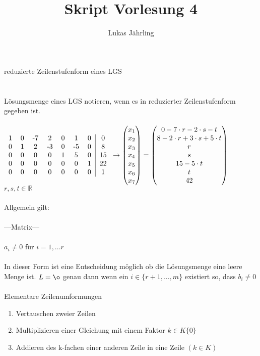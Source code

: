 \documentclass{scrartcl}
\title{Skript Vorlesung 4}
\author{Lukas Jährling}
\begin{document}
	\large
	reduzierte Zeilenstufenform eines LGS
	\\
	\\
	\\
	\normalsize
	Lösungsmenge eines LGS notieren, wenn es in reduzierter Zeilenstufenform gegeben ist.
	\\
	\\
	$
	\begin{tabular}{c c c c c c c|c}
		1 & 0 & -7 & 2 & 0 & 1 & 0 & 0
		\\
		0 & 1 & 2 & -3 & 0 & -5 & 0 & 8
		\\
		0 & 0 & 0 & 0 & 1 & 5 & 0 & 15
		\\
		0 & 0 & 0 & 0 & 0 & 0 & 1 & 22
		\\
		0 & 0 & 0 & 0 & 0 & 0 & 0 & 1
	\end{tabular}
	\rightarrow
	\begin{pmatrix}
		x_1 \\ x_2 \\ x_3 \\ x_4 \\ x_5 \\ x_6 \\ x_7
	\end{pmatrix}
	=
	\begin{pmatrix}
		0 -7\cdot r - 2\cdot s - t
		\\
		8 -2\cdot r + 3\cdot s + 5\cdot t
		\\
		r
		\\
		s
		\\
		15 - 5\cdot t
		\\
		t
		\\
		42
	\end{pmatrix}
	$
	$
	r, s, t \in \mathbb{R}
	$
	\\
	\\
	Allgemein gilt:
	\\
	\\
	---Matrix---
	\\
	\\
	$
	a_i \not = 0 $ für $ i=1,...r
	$
	\\
	\\In dieser Form ist eine Entscheidung möglich ob die Lösungsmenge eine leere Menge ist. $L = {\o}$ genau dann wenn ein $i \in \{r+1,...,m\}$ existiert so, dass $b_i \not = 0$
	\\
	\\
	Elementare Zeilenumformungen
	\begin{enumerate}
		\item Vertauschen zweier Zeilen
		\item Multiplizieren einer Gleichung mit einem Faktor $k\in K\{0\}$
		\item Addieren des k-fachen einer anderen Zeile in eine Zeile $(k\in K)$
	
	\end{enumerate}
	
\end{document}
